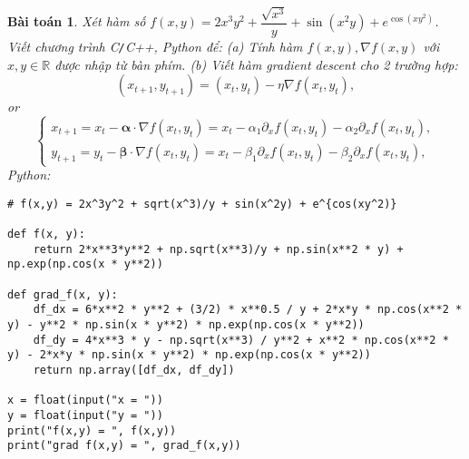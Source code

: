 \documentclass{article}
\newtheorem{baitoan}{Bài toán}
\begin{document}
\begin{baitoan}
	Xét hàm số $f(x,y) = 2x^3y^2 + \dfrac{\sqrt{x^3}}{y} + \sin(x^2y) + e^{\cos(xy^2)}$. Viết chương trình {\sf C{\tt/}C++, Python} để: (a) Tính hàm $f(x,y),\nabla f(x,y)$ với $x,y\in\mathbb{R}$ được nhập từ bàn phím. (b) Viết hàm gradient descent cho 2 trường hợp:
	\begin{equation*}
		(x_{t+1},y_{t+1}) = (x_t,y_t) - \eta\nabla f(x_t,y_t),
	\end{equation*}
	or
	\begin{equation*}
		\left\{\begin{split}
			x_{t+1} = x_t - \boldsymbol{\alpha}\cdot\nabla f(x_t,y_t) = x_t - \alpha_1\partial_xf(x_t,y_t) - \alpha_2\partial_xf(x_t,y_t),\\
			y_{t+1} = y_t - \boldsymbol{\beta}\cdot\nabla f(x_t,y_t) = x_t - \beta_1\partial_xf(x_t,y_t) - \beta_2\partial_xf(x_t,y_t),
		\end{split}\right.
	\end{equation*}
	Python:
	\begin{verbatim}
# f(x,y) = 2x^3y^2 + sqrt(x^3)/y + sin(x^2y) + e^{cos(xy^2)}

def f(x, y):
    return 2*x**3*y**2 + np.sqrt(x**3)/y + np.sin(x**2 * y) + np.exp(np.cos(x * y**2))

def grad_f(x, y):
    df_dx = 6*x**2 * y**2 + (3/2) * x**0.5 / y + 2*x*y * np.cos(x**2 * y) - y**2 * np.sin(x * y**2) * np.exp(np.cos(x * y**2))
    df_dy = 4*x**3 * y - np.sqrt(x**3) / y**2 + x**2 * np.cos(x**2 * y) - 2*x*y * np.sin(x * y**2) * np.exp(np.cos(x * y**2))
    return np.array([df_dx, df_dy])

x = float(input("x = "))
y = float(input("y = "))
print("f(x,y) = ", f(x,y))
print("grad f(x,y) = ", grad_f(x,y))
	\end{verbatim}
\end{baitoan}

\end{document}
